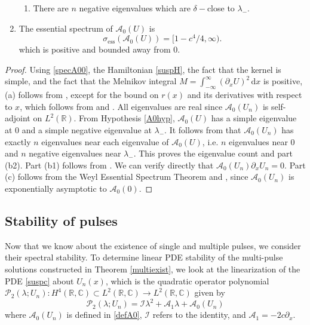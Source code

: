 \documentclass[review,onefignum,onetabnum]{siamart171218}
\newcommand{\C}{\mathbb{C}}
\newcommand{\R}{\mathbb{R}}
\newcommand{\rmd}{\mathrm{d}}
\newcommand{\calA}{\mathcal{A}}
\newcommand{\calI}{\mathcal{I}}
\newcommand{\calP}{\mathcal{P}}
\begin{document}
\begin{theorem}
\begin{enumerate}
\begin{enumerate}
    \item There are $n$ negative eigenvalues which are $\delta-$close to $\lambda_-$.
  \end{enumerate}

  \item The essential spectrum of $\calA_0(U)$ is
    \begin{equation}\label{A0ess}
    \sigma_{\text{ess}}(\calA_0(U)) = [1 - c^4/4, \infty).
    \end{equation}
    which is positive and bounded away from 0.

\end{enumerate}
\end{theorem}

\begin{proof}
Using \cref{specA00}, the Hamiltonian \cref{suspH}, the fact that the kernel is simple, and the fact that the Melnikov integral $M = \int_{-\infty}^\infty (\partial_x U)^2\,\rmd x$ is positive, (a) follows from \cite[Theorem~3.6]{sandstede:iol97}, except for the bound on $r(x)$ and its derivatives with respect to $x$, which follows from \cite{Sanstede1993} and \cite{sandstede:som98}. All eigenvalues are real since $\calA_0(U_n)$ is self-adjoint on $L^2(\R)$.  From Hypothesis \ref{A0hyp}, $\calA_0(U)$ has a simple eigenvalue at 0 and a simple negative eigenvalue at $\lambda_-$. It follows from \cite{alexander:ati90} that $\calA_0(U_n)$ has exactly $n$ eigenvalues near each eigenvalue of $\calA_0(U)$, i.e. $n$ eigenvalues near 0 and $n$ negative eigenvalues near $\lambda_-$. This proves the eigenvalue count and part (b2). Part (b1) follows from \cite{sandstede:som98}. We can verify directly that $\calA_0(U_n)\partial_x U_n = 0$. Part (c) follows from the Weyl Essential Spectrum Theorem \cite[Theorem~2.2.6]{kapitula:sad13} and \cite[Theorem~3.1.11]{kapitula:sad13}, since $\calA_0(U_n)$ is exponentially asymptotic to $\calA_0(0)$.
\end{proof}

\subsection{Stability of pulses}

Now that we know about the existence of single and multiple pulses, we consider their spectral stability. To determine linear PDE stability of the multi-pulse solutions constructed in Theorem \ref{multiexist}, we look at the linearization of the PDE \cref{suspc} about $U_n(x)$, which is the quadratic operator polynomial $\calP_2(\lambda; U_n): H^4(\R, \C) \subset L^2(\R,\C) \rightarrow L^2(\R,\C)$ given by
\begin{equation}\label{quadeig}
\calP_2(\lambda; U_n) = \calI \lambda^2 + \calA_1 \lambda + \calA_0(U_n)
\end{equation}
where $\calA_0(U_n)$ is defined in \cref{defA0}, $\calI$ refers to the identity, and $\calA_1=-2 c \partial_x$.
\end{document}
